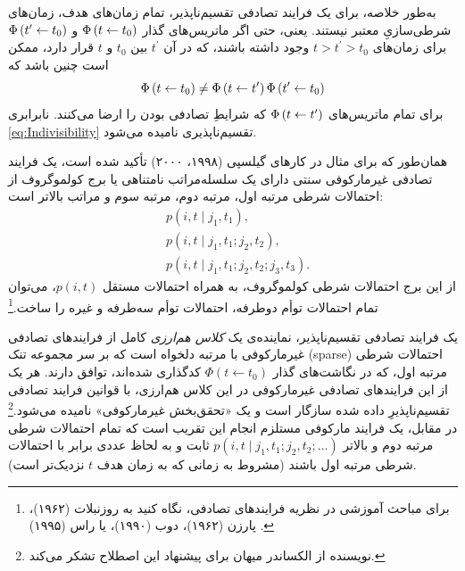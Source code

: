 \documentclass{article}
\newcommand{\stochasticmatrix}{\Phi}
\begin{document}
به‌طور خلاصه، برای یک فرایند تصادفی تقسیم‌ناپذیر، تمام زمان‌های هدف، زمان‌های شرطی‌سازیِ معتبر نیستند. یعنی، حتی اگر ماتریس‌های گذار $\stochasticmatrix\left(t\from t_{0}\right)$ و $\stochasticmatrix\left(t^{\prime}\from t_{0}\right)$ برای زمان‌های $t>t^{\prime}>t_{0}$ وجود داشته باشند، که در آن $t^{\prime}$ بین $t_{0}$ و $t$ قرار دارد، ممکن است چنین باشد که
\begin{equation}
\stochasticmatrix\left(t\from t_{0}\right)\ne\stochasticmatrix\left(t\from t^{\prime}\right)\stochasticmatrix\left(t^{\prime}\from t_{0}\right)\label{eq:Indivisibility}
\end{equation}
 برای تمام ماتریس‌های $\stochasticmatrix\left(t\from t^{\prime}\right)$ که شرایطِ تصادفی بودن را ارضا می‌کنند. نابرابری \eqref{eq:Indivisibility} تقسیم‌ناپذیری نامیده می‌شود.

همان‌طور که برای مثال در کارهای گیلسپی (۱۹۹۸، ۲۰۰۰) \nocite{Gillespie:1998dtsoasp,Gillespie:2000nsp} تأکید شده است،
یک فرایند تصادفی غیرمارکوفی سنتی دارای یک سلسله‌مراتب نامتناهی یا برج کولموگروف از احتمالات شرطی مرتبه اول، مرتبه دوم، مرتبه سوم و مراتب بالاتر است:
\begin{equation}
\begin{aligned} & p\left(i,t \mid j_{1},t_{1}\right),\\
 & p\left(i,t \mid j_{1},t_{1};j_{2},t_{2}\right),\\
 & p\left(i,t \mid j_{1},t_{1};j_{2},t_{2};j_{3},t_{3}\right).
\end{aligned}
\label{eq:NonMarkovianTowerConditionalProbabilities}
\end{equation}
از این برج احتمالات شرطی کولموگروف، به همراه احتمالات مستقل $p\left(i,t\right)$، می‌توان تمام احتمالات توأم دوطرفه، احتمالات توأم سه‌طرفه و غیره را ساخت.\footnote{برای مباحث آموزشی در نظریه فرایندهای تصادفی، نگاه کنید به روزنبلات (۱۹۶۲)، پارزن (۱۹۶۲)، دوب (۱۹۹۰)، یا راس (۱۹۹۵) \nocite{Rosenblatt:1962rp,Parzen:1962sp,Doob:1990sp,Ross:1995sp}.}

یک فرایند تصادفی تقسیم‌ناپذیر، نماینده‌ی یک \emph{کلاس هم‌ارزی} کامل از فرایندهای تصادفی غیرمارکوفی با مرتبه دلخواه است که بر سر مجموعه تنک (sparse) احتمالات شرطی مرتبه اول، که در نگاشت‌های گذار $\stochasticmatrix\left(t \leftarrow t_{0}\right)$ کدگذاری شده‌اند، توافق دارند.
هر یک از این فرایندهای تصادفی غیرمارکوفی در این کلاس هم‌ارزی، با قوانین فرایند تصادفی تقسیم‌ناپذیرِ داده شده سازگار است و یک «تحقق‌بخش غیرمارکوفی»  نامیده می‌شود.\footnote{نویسنده از الکساندر میهان برای پیشنهاد این اصطلاح تشکر می‌کند.}
در مقابل، یک فرایند مارکوفی مستلزم انجام این تقریب است که تمام احتمالات شرطی مرتبه دوم و بالاتر $p\left(i,t \mid j_{1},t_{1};j_{2},t_{2};\dots\right)$ ثابت و به لحاظ عددی برابر با احتمالات شرطی مرتبه اول باشند (مشروط به زمانی که به زمان هدف $t$ نزدیک‌تر است).
\end{document}
